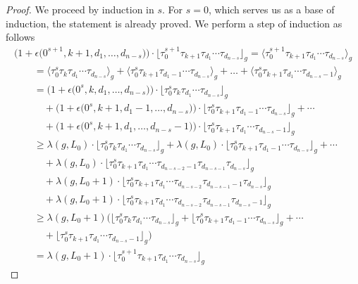 \begin{proof}
We proceed by induction in $s$. For $s=0$, which serves us as a base of induction, the statement is already proved. We
perform a step of induction as follows
\begin{gather*}
\big(1+\epsilon\big(0^{s+1},k+1,d_1,\dots,d_{n-s}\big)\big)
\cdot\big\lfloor\tau_0^{s+1}\tau_{k+1}\tau_{d_1}\cdots\tau_{d_{n-s}}\big\rfloor_g
 =\big\langle\tau_0^{s+1}\tau_{k+1}\tau_{d_1}\cdots\tau_{d_{n-s}}\big\rangle_g
\\
\qquad{} =\big\langle\tau_0^s\tau_k\tau_{d_1}\cdots\tau_{d_{n-s}}\big\rangle_g
+\big\langle\tau_0^s\tau_{k+1}\tau_{d_1-1}\cdots\tau_{d_{n-s}}\big\rangle_g
+\dots
+\big\langle\tau_0^s\tau_{k+1}\tau_{d_1}\cdots\tau_{d_{n-s}-1}\big\rangle_g
\\
\qquad{} =\big(1+\epsilon\big(0^s,k,d_1,\dots,d_{n-s}\big)\big)
\cdot\big\lfloor\tau_0^s\tau_k\tau_{d_1}\cdots\tau_{d_{n-s}}\big\rfloor_g
\\
\qquad\quad{}+\big(1+\epsilon\big(0^s,k+1,d_1-1,\dots,d_{n-s}\big)\big)
\cdot\big\lfloor\tau_0^s\tau_{k+1}\tau_{d_1-1}\cdots\tau_{d_{n-s}}\big\rfloor_g
+\cdots
\\
\qquad\quad{} +\big(1+\epsilon\big(0^s,k+1,d_1,\dots,d_{n-s}-1\big)\big)
\cdot\big\lfloor\tau_0^s\tau_{k+1}\tau_{d_1}\cdots\tau_{d_{n-s}-1}\big\rfloor_g
\\
\qquad{} \ge\lambda(g,L_0)
\cdot\big\lfloor\tau_0^s\tau_k\tau_{d_1}\cdots\tau_{d_{n-s}}\big\rfloor_g
+\lambda(g,L_0)
\cdot\big\lfloor\tau_0^s\tau_{k+1}\tau_{d_1-1}\cdots\tau_{d_{n-s}}\big\rfloor_g+\cdots
\\
\qquad\quad{} +\lambda(g,L_0)
\cdot\big\lfloor\tau_0^s\tau_{k+1}\tau_{d_1}\cdots\tau_{d_{n-s-2}-1}\tau_{d_{n-s-1}}\tau_{d_{n-s}}\big\rfloor_g\\
\qquad\quad{} +\lambda(g,L_0+1)
\cdot\big\lfloor\tau_0^s\tau_{k+1}\tau_{d_1}\cdots\tau_{d_{n-s-2}}\tau_{d_{n-s-1}-1}\tau_{d_{n-s}}\big\rfloor_g
\\
\qquad\quad{}
+\lambda(g,L_0+1)
\cdot\big\lfloor\tau_0^s\tau_{k+1}\tau_{d_1}\cdots\tau_{d_{n-s-2}}\tau_{d_{n-s-1}}\tau_{d_{n-s}-1}\big\rfloor_g
\\
\qquad{} \ge\lambda(g,L_0+1)\big(
\big\lfloor\tau_0^s\tau_k\tau_{d_1}\cdots\tau_{d_{n-s}}\big\rfloor_g
+\big\lfloor\tau_0^s\tau_{k+1}\tau_{d_1-1}\cdots\tau_{d_{n-s}}\big\rfloor_g
+\cdots\\
\qquad\quad{}
+\big\lfloor\tau_0^s\tau_{k+1}\tau_{d_1}\cdots\tau_{d_{n-s}-1}\big\rfloor_g
\big)\\
\qquad{} =
\lambda(g,L_0+1)
\cdot\big\lfloor\tau_0^{s+1}\tau_{k+1}\tau_{d_1}\cdots\tau_{d_{n-s}}\big\rfloor_g

\end{gather*}
\end{proof}
